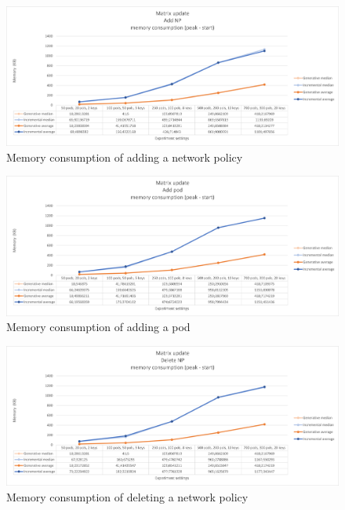 \begin{figure}[H]
    \centering
    \includegraphics[width=\textwidth]{images/experiment1/addNP-memory.png}
    \caption{Memory consumption of adding a network policy}
    \label{fig:exp1-addNP-memory}
\end{figure}
\begin{figure}[H]
    \centering
    \includegraphics[width=\textwidth]{images/experiment1/addPod-memory.png}
    \caption{Memory consumption of adding a pod}
    \label{fig:exp1-addPod-memory}
\end{figure}
\begin{figure}[H]
    \centering
    \includegraphics[width=\textwidth]{images/experiment1/delNP-memory.png}
    \caption{Memory consumption of deleting a network policy}
    \label{fig:exp1-delNP-memory}
\end{figure}
